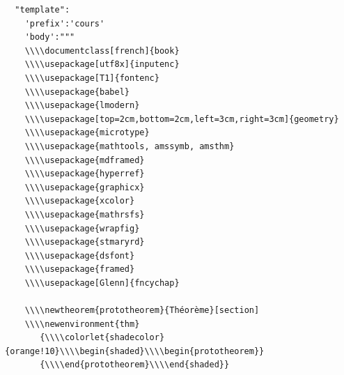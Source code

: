 \documentclass[french]{article}
\newtheorem{prototheorem}{Théorème}[section]
\theoremstyle{definition}
\theoremstyle{remark}
\begin{document}
\begin{verbatim}
  "template":
    'prefix':'cours'
    'body':"""
    \\\\documentclass[french]{book}
    \\\\usepackage[utf8x]{inputenc}
    \\\\usepackage[T1]{fontenc}
    \\\\usepackage{babel}
    \\\\usepackage{lmodern}
    \\\\usepackage[top=2cm,bottom=2cm,left=3cm,right=3cm]{geometry}
    \\\\usepackage{microtype}
    \\\\usepackage{mathtools, amssymb, amsthm}
    \\\\usepackage{mdframed}
    \\\\usepackage{hyperref}
    \\\\usepackage{graphicx}
    \\\\usepackage{xcolor}
    \\\\usepackage{mathrsfs}
    \\\\usepackage{wrapfig}
    \\\\usepackage{stmaryrd}
    \\\\usepackage{dsfont}
    \\\\usepackage{framed}
    \\\\usepackage[Glenn]{fncychap}

    \\\\newtheorem{prototheorem}{Théorème}[section]
    \\\\newenvironment{thm}
       {\\\\colorlet{shadecolor}{orange!10}\\\\begin{shaded}\\\\begin{prototheorem}}
       {\\\\end{prototheorem}\\\\end{shaded}}


\end{verbatim}
\end{document}
